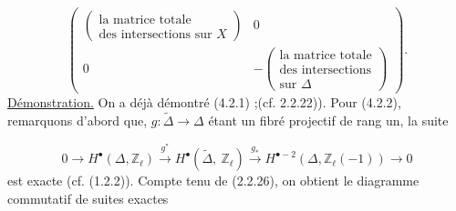 \begin{equation*}
\left(
\begin{array}{c|c}
\left(\begin{array}{l}\mbox{la matrice totale}\\ \mbox{des intersections sur } X\end{array}\right) & 0 \\ \hline
0 & -\left(\begin{array}{l}\mbox{la matrice totale}\\ \mbox{des intersections}\\ \mbox{sur } \Delta\end{array}\right)
\end{array}
\right) .
\end{equation*}
\underline{Démonstration.}  On a déjà démontré (4.2.1) ;(cf. 2.2.22)). Pour (4.2.2), remarquons d'abord que, $g : \widetilde{\Delta} \longrightarrow \Delta$ étant un fibré projectif de rang un, la suite

\begin{equation}\tag{4.2.4}
0 \longrightarrow H^{\bullet}(\Delta,\mathbb{Z}_{\ell}) \stackrel{g^{*}}{\longrightarrow} H^{\bullet}(\widetilde{\Delta},\ \mathbb{Z}_{\ell}) \stackrel{g_{*}}{\longrightarrow} H^{\bullet-2}(\Delta,\mathbb{Z}_{\ell}(-1)) \longrightarrow 0
\end{equation}
est exacte (cf. (1.2.2)). Compte tenu de (2.2.26), on obtient le diagramme commutatif  de suites exactes

